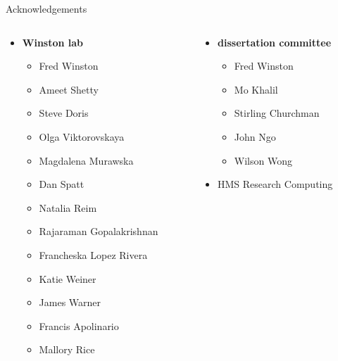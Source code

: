 \documentclass[aspectratio=169, 12pt]{beamer}
\begin{document}
\begin{frame}{Acknowledgements}
    \begin{columns}
        \begin{column}{0.5\textwidth}
            \begin{itemize}[]
                \item \textbf{Winston lab}
                    \begin{itemize}
                        \item Fred Winston
                        \item Ameet Shetty
                        \item Steve Doris
                        \item Olga Viktorovskaya
                        \item Magdalena Murawska
                        \item Dan Spatt
                        \item Natalia Reim
                        \item Rajaraman Gopalakrishnan
                        \item Francheska Lopez Rivera
                        \item Katie Weiner
                        \item James Warner
                        \item Francis Apolinario
                        \item Mallory Rice
                    \end{itemize}
            \end{itemize}
        \end{column}
        \begin{column}{0.5\textwidth}
            \begin{itemize}
                \item \textbf{dissertation committee}
                    \begin{itemize}[]
                        \item Fred Winston
                        \item Mo Khalil
                        \item Stirling Churchman
                        \item John Ngo
                        \item Wilson Wong
                    \end{itemize}
                \item HMS Research Computing

\end{itemize}
\end{column}
\end{columns}
\end{frame}
\end{document}
